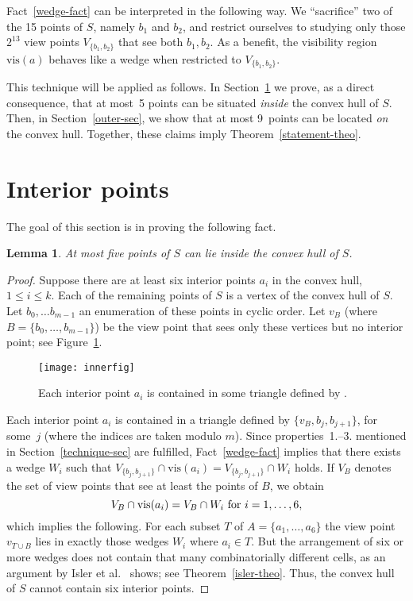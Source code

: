 \documentclass[11pt]{article}
\newtheorem{lemma}{Lemma}
\begin{document}
Fact~\ref{wedge-fact} can be interpreted in the following way. We ``sacrifice'' two of the 15 points of $S$,
namely $b_1$ and $b_2$, and restrict ourselves to studying only those $2^{13}$ view points $V_{\{b_1,b_2\}}$ 
that see both $b_1, b_2$.  As a benefit, the visibility region $\mbox{vis}(a)$ behaves like a wedge
when restricted to $V_{\{b_1,b_2\}}$.

This technique will be applied as follows.
In Section~\ref{inner-sec} we prove, as a direct consequence, that at most~5 points can be situated {\em inside} the 
convex hull of $S$. Then, in Section~\ref{outer-sec}, we show that at most 9~points can be located {\em on} the
convex hull. Together, these claims imply Theorem~\ref{statement-theo}.


\bigskip


\section{Interior points}         \label{inner-sec}

The goal of this section is in proving the following fact.

\begin{lemma}            \label{inner-lem}
At most five points of $S$ can lie inside the convex hull of $S$.
\end{lemma}
\begin{proof}
Suppose there are at least six interior points $a_i$ in the convex hull, $1 \leq i \leq k$.
Each of the remaining points of $S$ is a vertex of the convex hull of $S$.
Let $b_0, \ldots b_{m-1}$ an enumeration of these points in cyclic order. Let $v_B$ (where $B=\{b_0, \ldots, b_{m-1}\}$)
be the view point that sees only these vertices but no interior point; see Figure~\ref{inner-fig}.
\begin{figure}[hbtp]\begin{center}\texttt{[image: innerfig]}\caption{Each interior point $a_i$ is contained in some triangle defined by .}\label{inner-fig}
  \end{center}\end{figure}
Each interior point $a_i$ is contained in a triangle defined by $\{v_B,b_j,b_{j+1}\}$, for some~$j$ 
(where the indices are taken modulo $m$). 
Since properties~{1.--3.} mentioned in Section~\ref{technique-sec} are fulfilled, Fact~\ref{wedge-fact}
implies that there exists a wedge $W_i$ such that 
$V_{\{b_j,b_{j+1}\}} \cap \mbox{vis}(a_i) = V_{\{b_j,b_{j+1}\}} \cap W_i$ holds. 
If $V_B$ denotes the set of view points that see at least the points of $B$, 
 we obtain
\[
     V_B \cap \mbox{vis}(a_i) = V_B \cap W_i  \/ \mbox{ for } i=1, \ldots, 6,
\]
 which implies the following. For each subset $T$ of $A=\{a_1, \ldots, a_6\}$ the view point 
 $v_{T\cup B}$ lies in exactly those wedges $W_i$ where $a_i \in T$. But the arrangement
 of six or more wedges does not contain that many combinatorially different cells, as 
 an argument by Isler et al.~\cite{ikdv-vcdev-04} shows; see Theorem~\ref{isler-theo}. 
Thus, the convex hull of $S$ cannot contain six interior points.
\end{proof}
\end{document}
